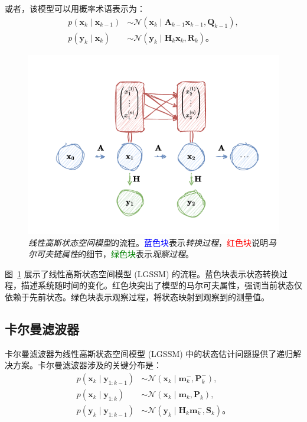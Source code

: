 或者，该模型可以用概率术语表示为：
\begin{align}
 p(\mathbf{x}_k \mid \mathbf{x}_{k-1}) &\sim \mathcal{N}(\mathbf{x}_k \mid \mathbf{A}_{k-1} \mathbf{x}_{k-1}, \mathbf{Q}_{k-1}), \\
 p(\mathbf{y}_k \mid \mathbf{x}_k) &\sim \mathcal{N}(\mathbf{y}_k \mid \mathbf{H}_k \mathbf{x}_k, \mathbf{R}_k)。
\end{align}

\begin{figure}[tb]
\centering
\includegraphics[width=0.75\linewidth]{fig/Markov Chian.pdf}
\caption{\textit{线性高斯状态空间模型}的流程。\textcolor{blue}{蓝色块}表示\textit{转换过程}，\textcolor{red}{红色块}说明\textit{马尔可夫链属性}的细节，\textcolor{green}{绿色块}表示\textit{观察过程}。}
\label{fig: LGSSM 流程图}
\end{figure}

图~\ref{fig: LGSSM 流程图} 展示了线性高斯状态空间模型 (LGSSM) 的流程。蓝色块表示状态转换过程，描述系统随时间的变化。红色块突出了模型的马尔可夫属性，强调当前状态仅依赖于先前状态。绿色块表示观察过程，将状态映射到观察到的测量值。

\subsection{卡尔曼滤波器}
卡尔曼滤波器为线性高斯状态空间模型 (LGSSM) 中的状态估计问题提供了递归解决方案。卡尔曼滤波器涉及的关键分布是：
\begin{align}
 p(\mathbf{x}_k \mid \mathbf{y}_{1:k-1}) &\sim \mathcal{N}(\mathbf{x}_k \mid \mathbf{m}_k^-, \mathbf{P}_k^-), \\
 p(\mathbf{x}_k \mid \mathbf{y}_{1:k}) &\sim \mathcal{N}(\mathbf{x}_k \mid \mathbf{m}_k, \mathbf{P}_k), \\
 p(\mathbf{y}_k \mid \mathbf{y}_{1:k-1}) &\sim \mathcal{N}(\mathbf{y}_k \mid \mathbf{H}_k \mathbf{m}_k^-, \mathbf{S}_k)。\label{eq: single likelihood}
\end{align}

